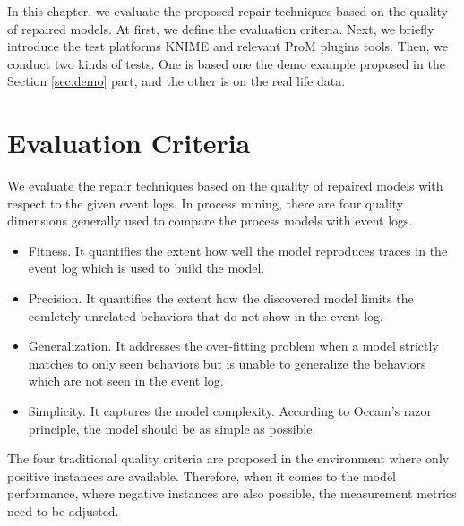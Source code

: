 In this chapter, we evaluate the proposed repair techniques based on the quality of repaired models. At first, we define the evaluation criteria. Next, we briefly introduce the test platforms KNIME and relevant ProM plugins tools. Then, we conduct two kinds of tests. One is based one the demo example proposed in the Section \ref{sec:demo} part, and the other is on the real life data. 
\section{Evaluation Criteria}
We evaluate the repair techniques based on the quality of repaired models with respect to the given event logs. In process mining, there are four quality dimensions generally used to compare the process models with event logs. 
\begin{itemize}
	\item Fitness. It quantifies the extent how well the model reproduces traces in the event log which is used to build the model.   
	\item Precision. It quantifies the extent how the discovered model limits the comletely unrelated behaviors that do not show in the event log. 
	\item Generalization. It addresses the over-fitting problem when a model strictly matches to only seen behaviors but is unable to generalize the behaviors which are not seen in the event log. 
	\item Simplicity. It captures the model complexity. According to Occam's razor principle, the model should be as simple as possible.
\end{itemize}
The four traditional quality criteria are proposed in the environment where only positive instances are available. Therefore, when it comes to the model performance, where negative instances are also possible, the measurement metrics need to be adjusted. 

